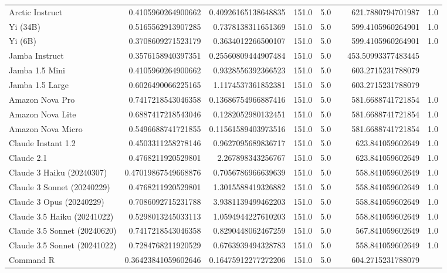 \begin{table}[htp]
{\begin{tabular}{lrrrrrrr}
Arctic Instruct & 0.4105960264900662 & 0.40926165138648835 & 151.0 & 5.0 &  & 621.7880794701987 & 1.0 \\
Yi (34B) & 0.5165562913907285 & 0.7378138311651369 & 151.0 & 5.0 &  & 599.4105960264901 & 1.0 \\
Yi (6B) & 0.3708609271523179 & 0.3634012266500107 & 151.0 & 5.0 &  & 599.4105960264901 & 1.0 \\
Jamba Instruct & 0.3576158940397351 & 0.25560809444907484 & 151.0 & 5.0 &  & 453.50993377483445 &  \\
Jamba 1.5 Mini & 0.4105960264900662 & 0.9328556392366523 & 151.0 & 5.0 &  & 603.2715231788079 &  \\
Jamba 1.5 Large & 0.6026490066225165 & 1.1174537361852381 & 151.0 & 5.0 &  & 603.2715231788079 &  \\
Amazon Nova Pro & 0.7417218543046358 & 0.13686754966887416 & 151.0 & 5.0 &  & 581.6688741721854 & 1.0 \\
Amazon Nova Lite & 0.6887417218543046 & 0.1282052980132451 & 151.0 & 5.0 &  & 581.6688741721854 & 1.0 \\
Amazon Nova Micro & 0.5496688741721855 & 0.11561589403973516 & 151.0 & 5.0 &  & 581.6688741721854 & 1.0 \\
Claude Instant 1.2 & 0.4503311258278146 & 0.9627095689836717 & 151.0 & 5.0 &  & 623.841059602649 & 1.0 \\
Claude 2.1 & 0.4768211920529801 & 2.267898343256767 & 151.0 & 5.0 &  & 623.841059602649 & 1.0 \\
Claude 3 Haiku (20240307) & 0.47019867549668876 & 0.7056786966639639 & 151.0 & 5.0 &  & 558.841059602649 & 1.0 \\
Claude 3 Sonnet (20240229) & 0.4768211920529801 & 1.3015588419326882 & 151.0 & 5.0 &  & 558.841059602649 & 1.0 \\
Claude 3 Opus (20240229) & 0.7086092715231788 & 3.9381139499462203 & 151.0 & 5.0 &  & 558.841059602649 & 1.0 \\
Claude 3.5 Haiku (20241022) & 0.5298013245033113 & 1.0594944227610203 & 151.0 & 5.0 &  & 558.841059602649 & 1.0 \\
Claude 3.5 Sonnet (20240620) & 0.7417218543046358 & 0.8290448062467259 & 151.0 & 5.0 &  & 567.841059602649 & 1.0 \\
Claude 3.5 Sonnet (20241022) & 0.7284768211920529 & 0.6763939494328783 & 151.0 & 5.0 &  & 558.841059602649 & 1.0 \\
Command R & 0.36423841059602646 & 0.16475912277272206 & 151.0 & 5.0 &  & 604.2715231788079 &  \\

\end{tabular}}
\end{table}
